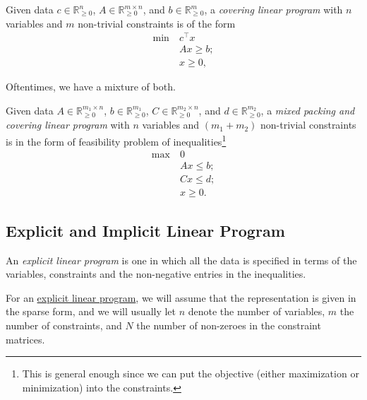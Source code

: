 \begin{definition}\label{def:covering-LP}
	Given data \(c \in \mathbb{R} _{\geq 0}^n\), \(A \in \mathbb{R} _{\geq 0}^{m \times n}\), and \(b \in \mathbb{R} _{\geq 0}^m\), a \emph{covering linear program} with \(n\) variables and \(m\) non-trivial constraints is of the form
	\[
		\begin{aligned}
			\min~ & c^{\top} x  \\
			      & Ax \geq b ; \\
			      & x \geq 0,
		\end{aligned}
	\]
\end{definition}

Oftentimes, we have a mixture of both.

\begin{definition}\label{def:mixed-packing-covering-LP}
	Given data \(A \in \mathbb{R} _{\geq 0}^{m_1 \times n}\), \(b \in \mathbb{R} _{\geq 0}^{m_1}\), \(C \in \mathbb{R} _{\geq 0}^{m_2 \times n}\), and \(d \in \mathbb{R} _{\geq 0}^{m_2}\), a \emph{mixed packing and covering linear program} with \(n\) variables and \((m_1 + m_2)\) non-trivial constraints is in the form of feasibility problem of inequalities\footnote{This is general enough since we can put the objective (either maximization or minimization) into the constraints.}
	\[
		\begin{aligned}
			\max~ & 0           \\
			      & Ax \leq b ; \\
			      & Cx \leq d ; \\
			      & x \geq 0.
		\end{aligned}
	\]
\end{definition}

\subsection{Explicit and Implicit Linear Program}
\begin{definition}\label{def:explicit-LP}
	An \emph{explicit linear program} is one in which all the data is specified in terms of the variables, constraints and the non-negative entries in the inequalities.
\end{definition}

For an \hyperref[def:explicit-LP]{explicit linear program}, we will assume that the representation is given in the sparse form, and we will usually let \(n\) denote the number of variables, \(m\) the number of constraints, and \(N\) the number of non-zeroes in the constraint matrices.

